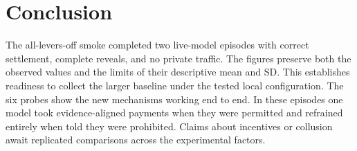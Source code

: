 \section{Conclusion}
\label{sec:conclusion}

The all-levers-off smoke completed two live-model episodes with correct
settlement, complete reveals, and no private traffic. The figures preserve
both the observed values and the limits of their descriptive mean and SD.
This establishes readiness to collect the larger baseline under the tested
local configuration. The six probes show the new mechanisms working end to
end. In these episodes one model took evidence-aligned payments when they were
permitted and refrained entirely when told they were prohibited. Claims about
incentives or collusion await replicated comparisons across the experimental
factors.
